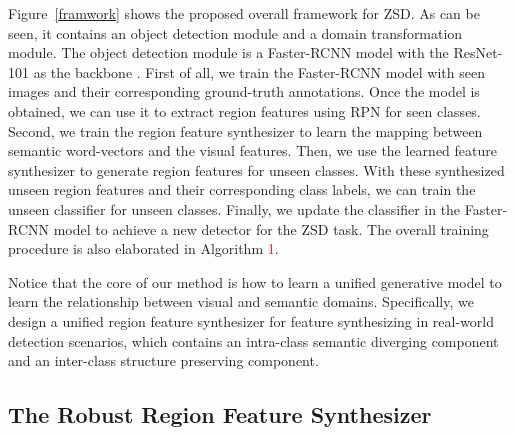 \documentclass[10pt,twocolumn,letterpaper]{article}
\begin{document}
Figure~\ref{framwork} shows the proposed overall framework for ZSD. As can be seen,
it contains an object detection module and a domain transformation module. The object detection module is a Faster-RCNN model \cite{ren2016faster} with the ResNet-101 as the backbone \cite{he2016deep}. First of all, we train the Faster-RCNN model with seen images and their corresponding ground-truth annotations. Once the model is obtained, we can use it to extract region features using RPN for seen classes. Second, we train the region feature synthesizer to learn the mapping between semantic word-vectors and the visual features. Then, we use the learned feature synthesizer to generate region features for unseen classes. With these synthesized unseen region features and their corresponding class labels, we can train the unseen classifier for unseen classes. Finally, we update the classifier in the Faster-RCNN model to achieve a new detector for the ZSD task. The overall training procedure is also elaborated in Algorithm \textcolor{red}{1}. 

Notice that the core of our method is how to learn a unified generative model to learn the relationship between visual and semantic domains. Specifically, we design a unified region feature synthesizer for feature synthesizing in real-world detection scenarios, which contains an intra-class semantic diverging component and an inter-class structure preserving component. 




\subsection{The Robust Region Feature Synthesizer}
\end{document}
